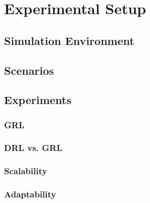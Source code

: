 \chapter{Experimental Setup}

\begin{comment}
	* TODO
\end{comment}


\section{Simulation Environment}

\section{Scenarios}


\section{Experiments}

\subsection{GRL}

\subsection{DRL vs. GRL}

\subsection{Scalability}

\subsection{Adaptability}


